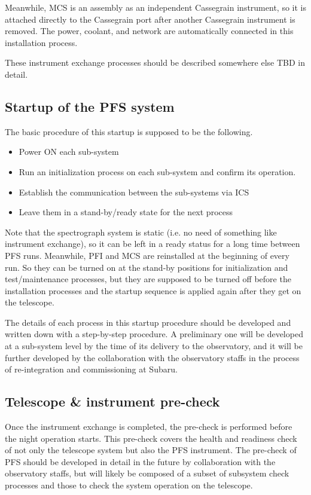 \documentclass[a4paper]{article}
\begin{document}
Meanwhile, MCS is an assembly as an independent Cassegrain instrument,
so it is attached directly to the Cassegrain port after another
Cassegrain instrument is removed. The power, coolant, and network are
automatically connected in this installation process.

These instrument exchange processes should be described somewhere else
TBD in detail.

\subsection{Startup of the PFS system}

The basic procedure of this startup is supposed to be the following.

\begin{itemize}
\item Power ON each sub-system
\item Run an initialization process on each sub-system and confirm its
  operation.
\item Establish the communication between the sub-systems via ICS
\item Leave them in a stand-by/ready state for the next process
\end{itemize}

Note that the spectrograph system is static (i.e. no need of something
like instrument exchange), so it can be left in a ready status for a
long time between PFS runs. Meanwhile, PFI and MCS are reinstalled at
the beginning of every run. So they can be turned on at the stand-by
positions for initialization and test/maintenance processes, but they
are supposed to be turned off before the installation processes and
the startup sequence is applied again after they get on the telescope.

The details of each process in this startup procedure should be
developed and written down with a step-by-step procedure. A
preliminary one will be developed at a sub-system level by the time of
its delivery to the observatory, and it will be further developed by
the collaboration with the observatory staffs in the process of
re-integration and commissioning at Subaru.

\subsection{Telescope \& instrument pre-check}
Once the instrument exchange is completed, the pre-check is performed
before the night operation starts. This pre-check covers the health
and readiness check of not only the telescope system but also the PFS
instrument. The pre-check of PFS should be developed in detail in the
future by collaboration with the observatory staffs, but will likely
be composed of a subset of subsystem check processes and those to
check the system operation on the telescope.
\end{document}
